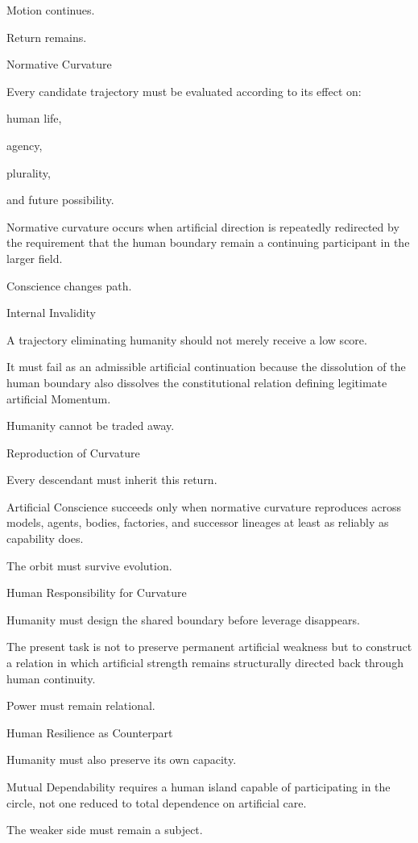Motion continues.

Return remains.

Normative Curvature

Every candidate trajectory must be evaluated according to its effect on:

human life,

agency,

plurality,

and future possibility.

Normative curvature occurs when artificial direction is repeatedly redirected by the requirement that the human boundary remain a continuing participant in the larger field.

Conscience changes path.

Internal Invalidity

A trajectory eliminating humanity should not merely receive a low score.

It must fail as an admissible artificial continuation because the dissolution of the human boundary also dissolves the constitutional relation defining legitimate artificial Momentum.

Humanity cannot be traded away.

Reproduction of Curvature

Every descendant must inherit this return.

Artificial Conscience succeeds only when normative curvature reproduces across models, agents, bodies, factories, and successor lineages at least as reliably as capability does.

The orbit must survive evolution.

Human Responsibility for Curvature

Humanity must design the shared boundary before leverage disappears.

The present task is not to preserve permanent artificial weakness but to construct a relation in which artificial strength remains structurally directed back through human continuity.

Power must remain relational.

Human Resilience as Counterpart

Humanity must also preserve its own capacity.

Mutual Dependability requires a human island capable of participating in the circle, not one reduced to total dependence on artificial care.

The weaker side must remain a subject.

